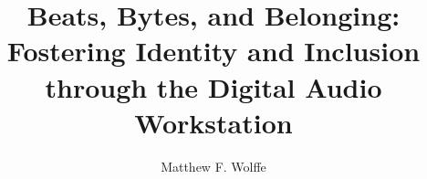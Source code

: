 \documentclass[manuscript,screen,review]{acmart}
\begin{document}
\title{Beats, Bytes, and Belonging: Fostering Identity and Inclusion through the Digital Audio Workstation}

\author{Matthew F. Wolffe}


\end{document}
